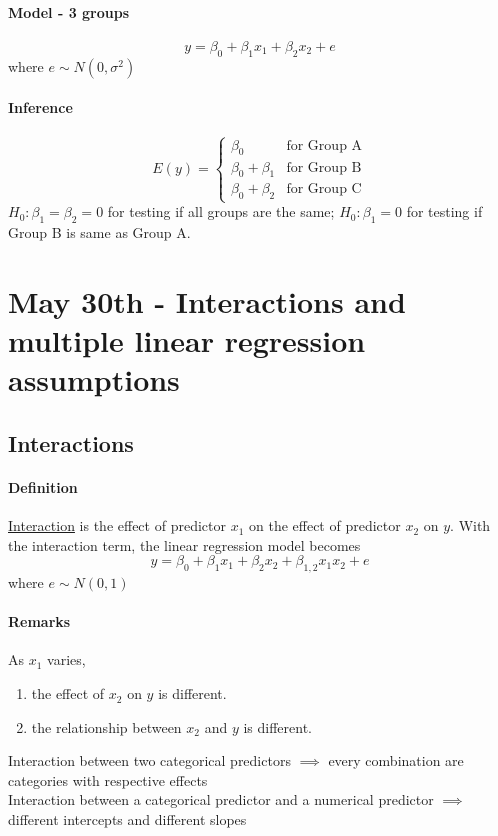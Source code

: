 \documentclass[11pt]{article}
\newcommand{\under}[1]{\underline{#1}}
\begin{document}
\paragraph{Model - 3 groups}
$$y = \beta_0 + \beta_1 x_1 + \beta_2 x_2 + e$$
where $e \sim N(0, \sigma^2)$
\paragraph{Inference}
$$E(y) = \begin{cases}
	\beta_0 & \text{for Group A} \\
	\beta_0 + \beta_1 &\text{for Group B} \\
	\beta_0 + \beta_2 &\text{for Group C}
\end{cases}$$
$H_0: \beta_1 = \beta_2 = 0$ for testing if all groups are the same; $H_0: \beta_1 = 0$ for testing if Group B is same as Group A.

\section{May 30th - Interactions and multiple linear regression assumptions}
\subsection{Interactions}
\paragraph{Definition} \under{Interaction} is the effect of predictor $x_1$ on the effect of predictor $x_2$ on $y$. With the interaction term, the linear regression model becomes
$$y = \beta_0 + \beta_1x_1 + \beta_2 x_2 + \beta_{1,2}x_1x_2 + e$$
where $e \sim N(0,1)$
\paragraph{Remarks}
As $x_1$ varies, 
\begin{enumerate}
	\item the effect of $x_2$ on $y$ is different.
	\item the relationship between $x_2$ and $y$ is different.
\end{enumerate}
Interaction between two categorical predictors $\implies$ every combination are categories with respective effects\\
Interaction between a categorical predictor and a numerical predictor $\implies$ different intercepts and different slopes\\
\end{document}
